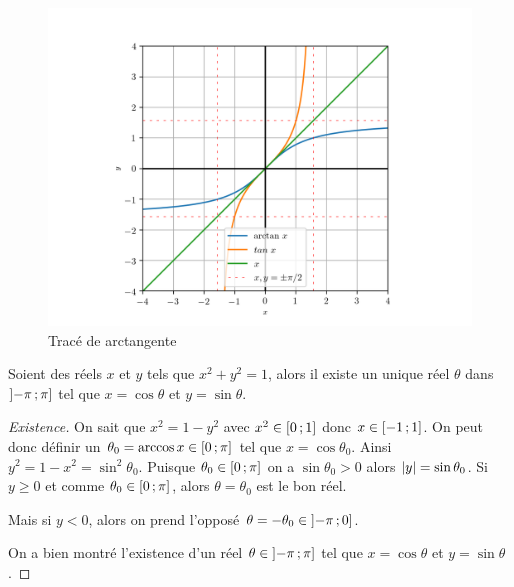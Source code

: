\begin{figure}
  \centering
  \includegraphics[scale=0.6]{arctan.png}
  \caption{Tracé de arctangente}
  \label{fig:tracearctangente}
\end{figure}
%
\begin{theo}
  \label{chap1-theo:thetasin}
  Soient des réels $x$ et $y$ tels que $x^2+y^2=1$, alors il existe un unique réel $\theta$ dans $\left] -\pi \, ;  \pi \right]$ tel que $x=\cos \theta$ et $y=\sin \theta$.
\end{theo}
\begin{proof}[Existence]
  On sait que $x^2=1-y^2$ avec $x^2 \in \left[ 0 \, ;  1 \right]$ donc $x \in \left[ -1 \, ;  1 \right]$. On peut donc définir un $\theta_0=\arccos x \in \left[ 0 \, ;  \pi \right]$ tel que $x=\cos \theta_0$. Ainsi $y^2=1-x^2=\sin^2 \theta_0$. Puisque $\theta_0 \in \left[ 0 \, ;  \pi \right]$ on a $\sin \theta_0>0$ alors $\left\lvert y\right\rvert=\sin \theta_0$.
Si $y \geq 0$ et comme $\theta_0 \in \left[ 0 \, ;  \pi \right]$, alors $\theta=\theta_0$ est le bon réel.

Mais si $y<0$, alors on prend l'opposé $\theta=-\theta_0 \in \left] -\pi \, ;  0 \right]$.

On a bien montré l'existence d'un réel $\theta \in \left] -\pi \, ;  \pi \right]$ tel que $x=\cos \theta$ et $y=\sin \theta$.
\end{proof}
